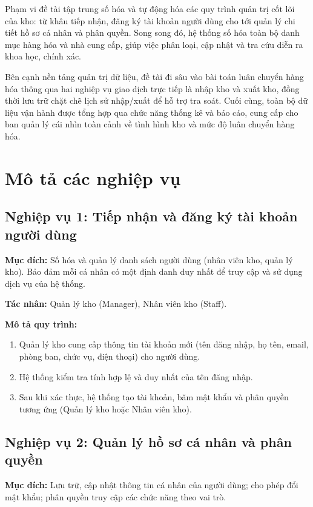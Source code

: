 \documentclass[12pt,a4paper]{report}
\begin{document}
Phạm vi đề tài tập trung số hóa và tự động hóa các quy trình quản trị cốt lõi
của kho: từ khâu tiếp nhận, đăng ký tài khoản người dùng cho tới quản lý chi
tiết hồ sơ cá nhân và phân quyền. Song song đó, hệ thống số hóa toàn bộ danh mục
hàng hóa và nhà cung cấp, giúp việc phân loại, cập nhật và tra cứu diễn ra khoa
học, chính xác.

Bên cạnh nền tảng quản trị dữ liệu, đề tài đi sâu vào bài toán luân chuyển hàng
hóa thông qua hai nghiệp vụ giao dịch trực tiếp là nhập kho và xuất kho, đồng
thời lưu trữ chặt chẽ lịch sử nhập/xuất để hỗ trợ tra soát. Cuối cùng, toàn bộ
dữ liệu vận hành được tổng hợp qua chức năng thống kê và báo cáo, cung cấp cho
ban quản lý cái nhìn toàn cảnh về tình hình kho và mức độ luân chuyển hàng hóa.

\section{Mô tả các nghiệp vụ}

\subsection{Nghiệp vụ 1: Tiếp nhận và đăng ký tài khoản người dùng}
\textbf{Mục đích:} Số hóa và quản lý danh sách người dùng (nhân viên kho, quản
lý kho). Bảo đảm mỗi cá nhân có một định danh duy nhất để truy cập và sử dụng
dịch vụ của hệ thống.

\noindent\textbf{Tác nhân:} Quản lý kho (Manager), Nhân viên kho (Staff).

\noindent\textbf{Mô tả quy trình:}
\begin{enumerate}[leftmargin=1.4cm]
  \item Quản lý kho cung cấp thông tin tài khoản mới (tên đăng nhập, họ tên,
  email, phòng ban, chức vụ, điện thoại) cho người dùng.
  \item Hệ thống kiểm tra tính hợp lệ và duy nhất của tên đăng nhập.
  \item Sau khi xác thực, hệ thống tạo tài khoản, băm mật khẩu và phân quyền
  tương ứng (Quản lý kho hoặc Nhân viên kho).
\end{enumerate}

\subsection{Nghiệp vụ 2: Quản lý hồ sơ cá nhân và phân quyền}
\textbf{Mục đích:} Lưu trữ, cập nhật thông tin cá nhân của người dùng; cho phép
đổi mật khẩu; phân quyền truy cập các chức năng theo vai trò.
\end{document}
